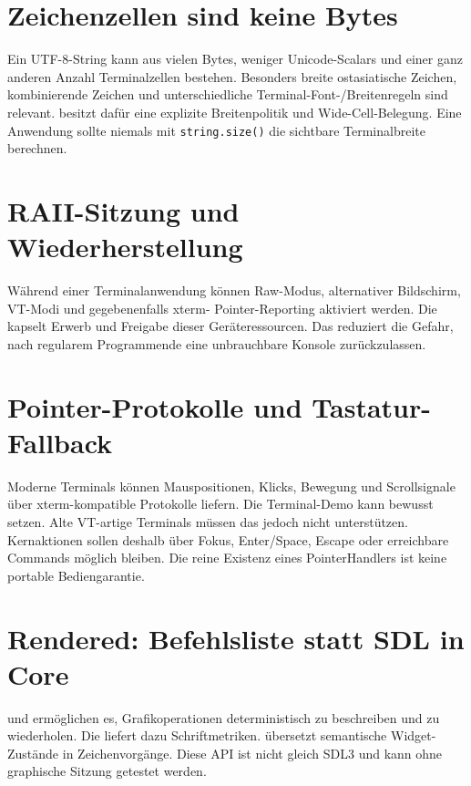\section{Zeichenzellen sind keine Bytes}
Ein UTF-8-String kann aus vielen Bytes,
weniger Unicode-Scalars und einer ganz
anderen Anzahl Terminalzellen bestehen.
Besonders breite ostasiatische Zeichen,
kombinierende Zeichen und unterschiedliche
Terminal-Font-/Breitenregeln sind relevant.
 besitzt dafür eine
explizite Breitenpolitik und
Wide-Cell-Belegung.
Eine Anwendung sollte niemals mit
\texttt{string.size()} die sichtbare
Terminalbreite berechnen.

\section{RAII-Sitzung und Wiederherstellung}
Während einer Terminalanwendung können
Raw-Modus, alternativer Bildschirm,
VT-Modi und gegebenenfalls xterm-
Pointer-Reporting aktiviert werden.
Die  kapselt
Erwerb und Freigabe dieser Geräteressourcen.
Das reduziert die Gefahr, nach regularem
Programmende eine unbrauchbare Konsole
zurückzulassen.


\section{Pointer-Protokolle und Tastatur-Fallback}
Moderne Terminals können Mauspositionen,
Klicks, Bewegung und Scrollsignale über
xterm-kompatible Protokolle liefern.
Die Terminal-Demo kann
bewusst setzen. Alte VT-artige Terminals
müssen das jedoch nicht unterstützen.
Kernaktionen sollen deshalb über
Fokus, Enter/Space, Escape oder
erreichbare Commands möglich bleiben.
Die reine Existenz eines PointerHandlers
ist keine portable Bediengarantie.

\section{Rendered: Befehlsliste statt SDL in Core}
 und 
ermöglichen es, Grafikoperationen
deterministisch zu beschreiben und
zu wiederholen. Die
liefert dazu Schriftmetriken.
übersetzt semantische Widget-Zustände
in Zeichenvorgänge. Diese API ist
nicht gleich SDL3 und kann ohne
graphische Sitzung getestet werden.

